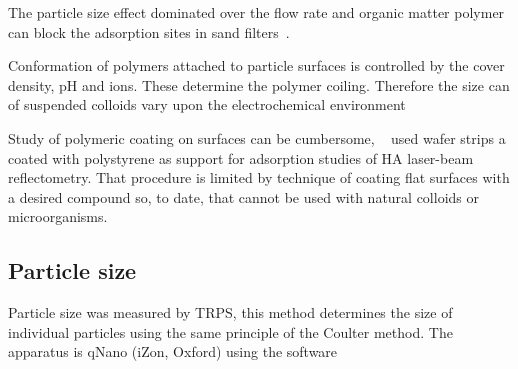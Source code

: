 \documentclass[journal=langd5,manuscript=article]{achemso}
\begin{document}
The particle size effect dominated over the flow rate and organic matter polymer can block the adsorption sites in sand filters~\cite{Yang2015InterplayModeling}.

Conformation of polymers attached to particle surfaces is controlled by the cover density, pH and ions. These determine the polymer coiling. Therefore the size can of suspended colloids vary upon the electrochemical environment~\cite{Morales2011a}


Study of polymeric coating   on surfaces can be cumbersome,
~\citeauthor{doi:10.1021/es981236u}\cite{doi:10.1021/es981236u}
used   wafer strips  a coated with  polystyrene as support for
adsorption studies of HA laser-beam reflectometry. That procedure is
limited by technique of coating flat surfaces with a desired compound so, to date, that cannot be used with  natural colloids or microorganisms.












\subsection{Particle size}
Particle size was measured by 
TRPS, this method determines the size of individual particles using the same principle of the Coulter method. The apparatus is qNano (iZon, Oxford) using the software
\end{document}
